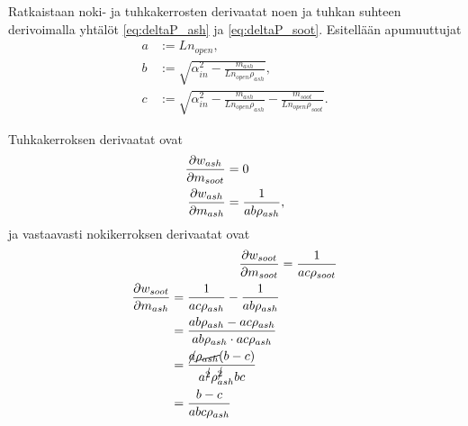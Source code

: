 Ratkaistaan noki- ja tuhkakerrosten derivaatat noen ja tuhkan suhteen derivoimalla yhtälöt \eqref{eq:deltaP_ash} ja \eqref{eq:deltaP_soot}.
Esitellään apumuuttujat
\begin{align*}
    a &:= L n_{open}, \\
    b &:= \sqrt{\alpha_{in}^2 - \frac{m_{ash}}{L n_{open} \rho_{ash}}}, \\
    c &:= \sqrt{\alpha_{in}^2 - \frac{m_{ash}}{L n_{open} \rho_{ash}} - \frac{m_{soot}}{L n_{open} \rho_{soot}}}.
\end{align*}

Tuhkakerroksen derivaatat ovat
\begin{align}
    \frac{\partial w_{ash}}{\partial m_{soot}} & =0\\
    \frac{\partial w_{ash}}{\partial m_{ash}} &= \frac{1}{ab\rho_{ash}},
\end{align}
ja vastaavasti nokikerroksen derivaatat ovat
\begin{align}
    \frac{\partial w_{soot}}{\partial m_{soot}} &= \frac{1}{ac\rho_{soot}}\\
    \begin{split}
    \frac{\partial w_{soot}}{\partial m_{ash}} &= \frac{1}{ac\rho_{ash}}-\frac{1}{ab\rho_{ash}}
    \\ &= \frac{ab \rho_{ash} - ac\rho_{ash}}{ab\rho_{ash}\cdot ac \rho_{ash}}
    \\ &= \frac{\cancel{a}\cancel{\rho_{ash}}(b-c)}{a^{\cancel{2}} \rho_{ash}^{\cancel{2}} bc}
    \\ &= \frac{b-c}{abc\rho_{ash}}
    \end{split}
\end{align}








